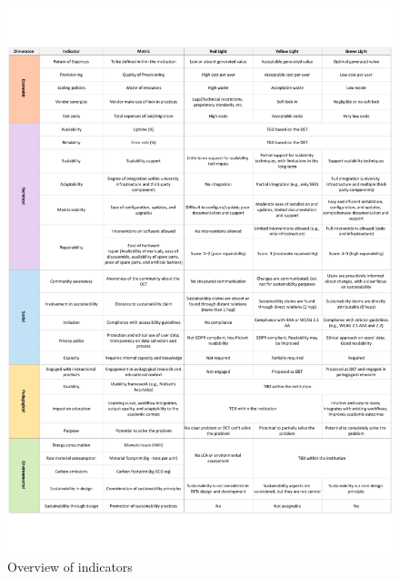 \begin{figure}[ht]
    \centering
    \includegraphics[width=1\linewidth]{attachments/indicators_overview.pdf}
    \caption{Overview of indicators}
    \label{fig:A1_attach_indicators_overview}
\end{figure}

